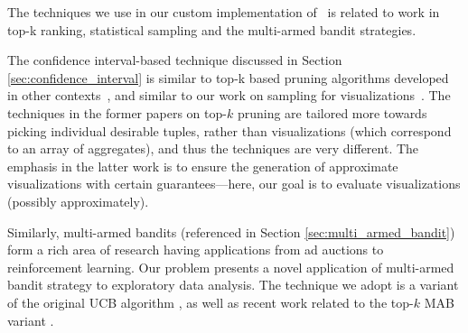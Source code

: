 


The techniques we use in our custom implementation of \SeeDB\ is
related to work in top-k ranking, statistical sampling and the multi-armed bandit strategies. 

The confidence interval-based technique discussed in Section \ref{sec:confidence_interval} 
is similar to top-k based pruning algorithms developed 
in other contexts~\cite{DBLP:conf/pods/FaginLN01, 
DBLP:conf/vldb/IlyasAE04, DBLP:conf/ICDE/ReDS07},
and similar to our work on  
sampling for visualizations~\cite{DBLP:journals/corr/KimBPIMR14}.
The techniques in the former papers on top-$k$ pruning are 
tailored more towards picking individual desirable tuples,
rather than visualizations (which correspond to an array of aggregates),
and thus the techniques are very different.
The emphasis in the latter work is to ensure the generation of
approximate visualizations with certain guarantees---here,
our goal is to evaluate visualizations (possibly approximately). 

Similarly, multi-armed bandits (referenced in Section \ref{sec:multi_armed_bandit}) form 
a rich area of research having applications from ad auctions to reinforcement learning. 
Our problem presents a novel application of multi-armed bandit strategy to 
exploratory data analysis.
The technique we adopt is 
a variant of the original UCB algorithm \cite{AuerCF02, LaiR85},
as well as recent work related to the top-$k$ MAB variant \cite{BubeckWV13,
audibert2010best}. 

